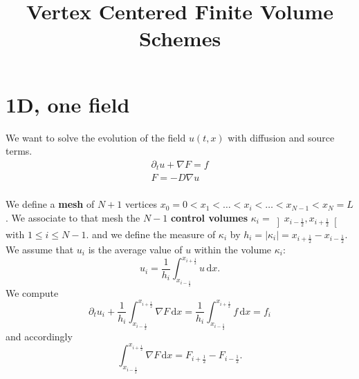 \documentclass[aps,onecolumn]{revtex4}
\newcommand{\half}{\frac{1}{2}}
\newcommand{\myd}{\,\text{d}}
\begin{document}
\title{Vertex Centered Finite Volume Schemes}

\maketitle

\section{1D, one field}
We want to solve the evolution of the field $u(t,x)$ with diffusion and source terms.
\begin{equation}
	\begin{array}{l}
		\partial_t u + \nabla F = f\\
		F = -D \nabla u\\
	\end{array}
\end{equation}

We define a {\bf mesh} of $N+1$ vertices $x_0=0<x_1<\ldots<x_i<\ldots<x_{N-1}<x_N=L$.
We associate to that mesh the $N-1$ {\bf control volumes} $\kappa_{i}=\left\rbrack x_{i-\half}, x_{i+\half}\right\lbrack$ with $1\leq i \leq N-1$.
and we define the measure of $\kappa_i$ by $h_i=\vert \kappa_i \vert=x_{i+\half} - x_{i-\half}$.
We assume that $u_i$ is the average value of $u$ within the volume $\kappa_i$:
\begin{equation}
	u_i = \dfrac{1}{h_i}\int_{x_{i-\half}}^{x_{i+\half}} u\myd x.
\end{equation}
We compute
\begin{equation}
	\partial_t u_i + \dfrac{1}{h_i} \int_{x_{i-\half}}^{x_{i+\half}} \nabla F \myd x = \dfrac{1}{h_i} \int_{x_{i-\half}}^{x_{i+\half}} f \myd x = f_i
\end{equation}
and accordingly
\begin{equation}
	\int_{x_{i-\half}}^{x_{i+\half}} \nabla F \myd x = F_{i+\half} - F_{i-\half}.
\end{equation}
\end{document}
